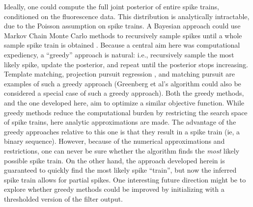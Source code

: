 Ideally, one could compute the full joint posterior of entire spike trains, conditioned on the fluorescence data.  This distribution is analytically intractable, due to the Poisson assumption on spike trains.  A Bayesian approach could use Markov Chain Monte Carlo methods to recursively sample spikes until a whole sample spike train is obtained \cite{AndrieuDoucet01,MishchenkoPaninski09}.  Because a central aim here was computational expediency, a ``greedy'' approach is natural: i.e.,  recursively sample the most likely spike, update the posterior, and repeat until the posterior stops increasing.  Template matching, projection pursuit regression \cite{FS81}, and matching pursuit \cite{MallatZhang93} are examples of such a greedy approach (Greenberg et al's algorithm \cite{GreenbergKerr08} could also be considered a special case of such a greedy approach).  Both the greedy methods, and the one developed here, aim to optimize a similar objective function.  While greedy methods reduce the computational burden by restricting the search space of spike trains, here analytic approximations are made.  The advantage of the greedy approaches relative to this one is that they result in a spike train (ie, a binary sequence).  However, because of the numerical approximations and restrictions, one can never be sure whether the algorithm finds the \emph{most} likely possible spike train.  On the other hand, the approach developed herein is guaranteed to quickly find the most likely spike ``train'', but now the inferred spike train allows for partial spikes.  %
One interesting future direction might be to explore whether greedy methods could be improved by initializing with a thresholded version of the \foopsi filter output. 



